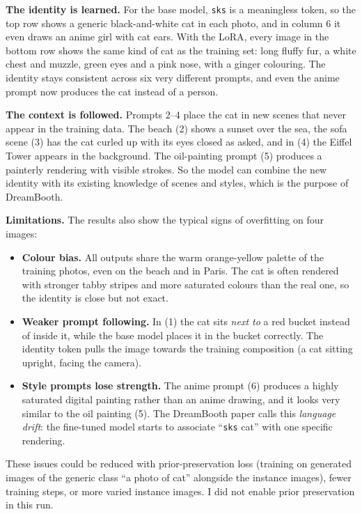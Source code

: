 \documentclass[a4paper]{article} %
\begin{document}
\textbf{The identity is learned.} For the base model, \texttt{sks} is a meaningless token, so the
top row shows a generic black-and-white cat in each photo, and in column 6 it even draws an anime
girl with cat ears. With the LoRA, every image in the bottom row shows the same kind of cat as the
training set: long fluffy fur, a white chest and muzzle, green eyes and a pink nose, with a ginger
colouring. The identity stays consistent across six very different prompts, and even the anime
prompt now produces the cat instead of a person.

\textbf{The context is followed.} Prompts 2--4 place the cat in new scenes that never appear in
the training data. The beach (2) shows a sunset over the sea, the sofa scene (3) has the cat curled
up with its eyes closed as asked, and in (4) the Eiffel Tower appears in the background. The
oil-painting prompt (5) produces a painterly rendering with visible strokes. So the model can
combine the new identity with its existing knowledge of scenes and styles, which is the purpose of
DreamBooth.

\textbf{Limitations.} The results also show the typical signs of overfitting on four images:
\begin{itemize}
    \item \textbf{Colour bias.} All outputs share the warm orange-yellow palette of the training
    photos, even on the beach and in Paris. The cat is often rendered with stronger tabby stripes and
    more saturated colours than the real one, so the identity is close but not exact.
    \item \textbf{Weaker prompt following.} In (1) the cat sits \emph{next to} a red bucket instead
    of inside it, while the base model places it in the bucket correctly. The identity token pulls
    the image towards the training composition (a cat sitting upright, facing the camera).
    \item \textbf{Style prompts lose strength.} The anime prompt (6) produces a highly saturated
    digital painting rather than an anime drawing, and it looks very similar to the oil painting
    (5). The DreamBooth paper calls this \emph{language drift}: the fine-tuned model starts to
    associate ``\texttt{sks} cat'' with one specific rendering.
\end{itemize}
These issues could be reduced with prior-preservation loss (training on generated images of the
generic class ``a photo of cat'' alongside the instance images), fewer training steps, or more
varied instance images. I did not enable prior preservation in this run.
\end{document}
